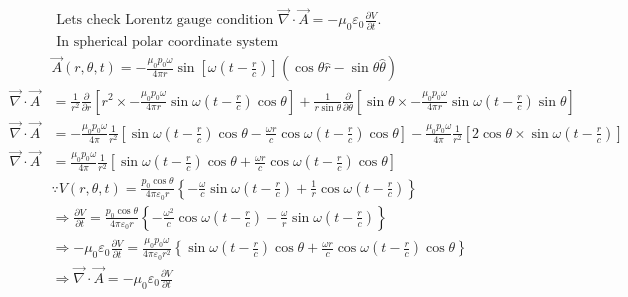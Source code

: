 \begin{enumerate}
	\begin{answer}
		\begin{align*}
		&\text { Lets check }\text{Lorentz gauge condition } \vec{\nabla} \cdot \vec{A}=-\mu_{0} \varepsilon_{0} \frac{\partial V}{\partial t} \text {. }\\
		&\text { In spherical}\text{ polar coordinate system }\\
		&\vec{A}(r, \theta, t)=-\frac{\mu_{0} p_{0} \omega}{4 \pi r} \sin \left[\omega\left(t-\frac{r}{c}\right)\right](\cos \theta \hat{r}-\sin \theta \hat{\theta})\\
		\vec{\nabla} \cdot \vec{A}&=\frac{1}{r^{2}} \frac{\partial}{\partial r}\left[r^{2} \times-\frac{\mu_{0} p_{0} \omega}{4 \pi r} \sin \omega\left(t-\frac{r}{c}\right) \cos \theta\right]+\frac{1}{r \sin \theta} \frac{\partial}{\partial \theta}\left[\sin \theta \times-\frac{\mu_{0} p_{0} \omega}{4 \pi r} \sin \omega\left(t-\frac{r}{c}\right) \sin \theta\right] \\
		\vec{\nabla} \cdot \vec{A}&=-\frac{\mu_{0} p_{0} \omega}{4 \pi} \frac{1}{r^{2}}\left[\sin \omega\left(t-\frac{r}{c}\right) \cos \theta-\frac{\omega r}{c} \cos \omega\left(t-\frac{r}{c}\right) \cos \theta\right]-\frac{\mu_{0} p_{0} \omega}{4 \pi} \frac{1}{r^{2}}\left[2 \cos \theta \times \sin \omega\left(t-\frac{r}{c}\right)\right] \\
		\vec{\nabla} \cdot \vec{A}&=\frac{\mu_{0} p_{0} \omega}{4 \pi} \frac{1}{r^{2}}\left[\sin \omega\left(t-\frac{r}{c}\right) \cos \theta+\frac{\omega r}{c} \cos \omega\left(t-\frac{r}{c}\right) \cos \theta\right] \\
		&\because V(r, \theta, t)=\frac{p_{0} \cos \theta}{4 \pi \varepsilon_{0} r}\left\{-\frac{\omega}{c} \sin \omega\left(t-\frac{r}{c}\right)+\frac{1}{r} \cos \omega\left(t-\frac{r}{c}\right)\right\}\\
		&\Rightarrow \frac{\partial V}{\partial t}=\frac{p_{0} \cos \theta}{4 \pi \varepsilon_{0} r}\left\{-\frac{\omega^{2}}{c} \cos \omega\left(t-\frac{r}{c}\right)-\frac{\omega}{r} \sin \omega\left(t-\frac{r}{c}\right)\right\} \\
		&\Rightarrow-\mu_{0} \varepsilon_{0} \frac{\partial V}{\partial t}=\frac{\mu_{0} p_{0} \omega}{4 \pi \varepsilon_{0} r^{2}}\left\{\sin \omega\left(t-\frac{r}{c}\right) \cos \theta+\frac{\omega r}{c} \cos \omega\left(t-\frac{r}{c}\right) \cos \theta\right\} \\
		&\Rightarrow \vec{\nabla} \cdot \vec{A}=-\mu_{0} \varepsilon_{0} \frac{\partial V}{\partial t}
		\end{align*}

\end{answer}
\end{enumerate}
